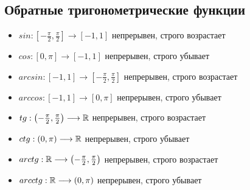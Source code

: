     \subsection*{Обратные тригонометрические функции}
    \begin{itemize}
        \item[] $sin: [-\frac{\pi}{2}, \frac{\pi}{2}] \longrightarrow [-1, 1]$ \quad непрерывен, строго возрастает
        \item[] $cos: [0, \pi] \longrightarrow [-1, 1]$ \quad непрерывен, строго убывает
        \item[] \qquad $arcsin: [-1, 1] \longrightarrow [-\frac{\pi}{2}, \frac{\pi}{2}]$ \quad непрерывен, строго возрастает 
        \item[] \qquad $arccos: [-1, 1] \longrightarrow [0, \pi]$ \quad непрерывен, строго убывает 
        \item[] $tg: \left(-\frac{\pi}{2}, \frac{\pi}{2}\right) \longrightarrow \mathbb{R}$ \quad непрерывен, строго возрастает 
        \item[] $ctg: (0, \pi) \longrightarrow \mathbb{R}$ \quad непрерывен, строго убывает
        \item[] \qquad $arctg: \mathbb{R} \longrightarrow \left(-\frac{\pi}{2}, \frac{\pi}{2}\right)$ \quad непрерывен, строго возрастает
        \item[] \qquad $arcctg: \mathbb{R} \longrightarrow (0, \pi)$ \quad непрерывен, строго убывает 
    \end{itemize}